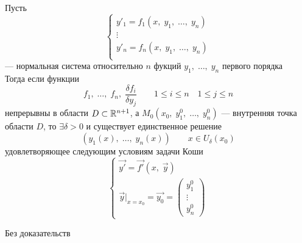 \begin{Th}
    Пусть 
    \[
        \begin{cases}
            y'_1 = f_1(x,\; y_1,\; \dots,\; y_n)\\
            \vdots\\
            y'_n = f_n(x,\; y_1,\; \dots,\; y_n)\\
        \end{cases}
    \]
    --- нормальная система относительно $n$ фукций $y_1,\; \dots,\; y_n$ первого порядка\\
    
    Тогда если функции
    \[
        f_1,\; \dots,\; f_n,\; \frac{\delta f_i}{\delta y_j} \qquad 1 \leqslant i \leqslant n \quad 1\leqslant j \leqslant n
    \]
    непрерывны в области $D \subset \mathbb{R}^{n+1}$, а $M_0(x_0,\; y^0_1,\; \dots,\; y^0_n)$ --- внутренняя точка области $D$, то $\exists \delta > 0$ и существует единственное решение 
    \[
        (y_1(x),\; \dots,\; y_n(x)) \qquad x \in U_\delta(x_0)
    \] 
    удовлетворяющее следующим условиям задачи Коши
    \[
        \begin{cases}
            \vec{y'} = \vec{f'}(x,\; \vec{y})\\
            \vec{y}|_{x = x_0} = \vec{y_0} = 
            \begin{pmatrix}
                y^0_1\\
                \vdots\\
                y^0_n
            \end{pmatrix}
        \end{cases}
    \]
\end{Th} 
\begin{Proof}
    Без доказательств
\end{Proof}

